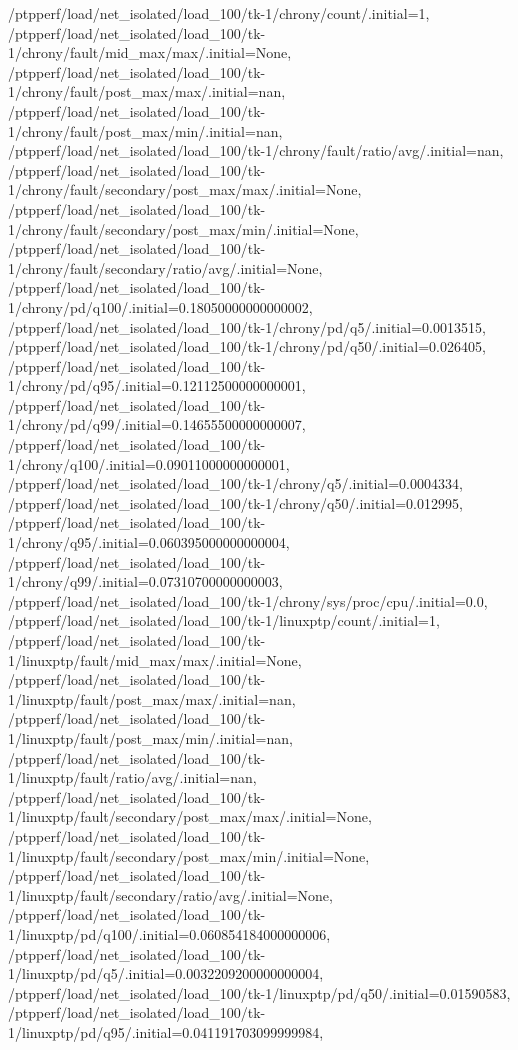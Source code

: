 {    /ptpperf/load/net_isolated/load_100/tk-1/chrony/count/.initial=1,
    /ptpperf/load/net_isolated/load_100/tk-1/chrony/fault/mid_max/max/.initial=None,
    /ptpperf/load/net_isolated/load_100/tk-1/chrony/fault/post_max/max/.initial=nan,
    /ptpperf/load/net_isolated/load_100/tk-1/chrony/fault/post_max/min/.initial=nan,
    /ptpperf/load/net_isolated/load_100/tk-1/chrony/fault/ratio/avg/.initial=nan,
    /ptpperf/load/net_isolated/load_100/tk-1/chrony/fault/secondary/post_max/max/.initial=None,
    /ptpperf/load/net_isolated/load_100/tk-1/chrony/fault/secondary/post_max/min/.initial=None,
    /ptpperf/load/net_isolated/load_100/tk-1/chrony/fault/secondary/ratio/avg/.initial=None,
    /ptpperf/load/net_isolated/load_100/tk-1/chrony/pd/q100/.initial=0.18050000000000002,
    /ptpperf/load/net_isolated/load_100/tk-1/chrony/pd/q5/.initial=0.0013515,
    /ptpperf/load/net_isolated/load_100/tk-1/chrony/pd/q50/.initial=0.026405,
    /ptpperf/load/net_isolated/load_100/tk-1/chrony/pd/q95/.initial=0.12112500000000001,
    /ptpperf/load/net_isolated/load_100/tk-1/chrony/pd/q99/.initial=0.14655500000000007,
    /ptpperf/load/net_isolated/load_100/tk-1/chrony/q100/.initial=0.09011000000000001,
    /ptpperf/load/net_isolated/load_100/tk-1/chrony/q5/.initial=0.0004334,
    /ptpperf/load/net_isolated/load_100/tk-1/chrony/q50/.initial=0.012995,
    /ptpperf/load/net_isolated/load_100/tk-1/chrony/q95/.initial=0.060395000000000004,
    /ptpperf/load/net_isolated/load_100/tk-1/chrony/q99/.initial=0.07310700000000003,
    /ptpperf/load/net_isolated/load_100/tk-1/chrony/sys/proc/cpu/.initial=0.0,
    /ptpperf/load/net_isolated/load_100/tk-1/linuxptp/count/.initial=1,
    /ptpperf/load/net_isolated/load_100/tk-1/linuxptp/fault/mid_max/max/.initial=None,
    /ptpperf/load/net_isolated/load_100/tk-1/linuxptp/fault/post_max/max/.initial=nan,
    /ptpperf/load/net_isolated/load_100/tk-1/linuxptp/fault/post_max/min/.initial=nan,
    /ptpperf/load/net_isolated/load_100/tk-1/linuxptp/fault/ratio/avg/.initial=nan,
    /ptpperf/load/net_isolated/load_100/tk-1/linuxptp/fault/secondary/post_max/max/.initial=None,
    /ptpperf/load/net_isolated/load_100/tk-1/linuxptp/fault/secondary/post_max/min/.initial=None,
    /ptpperf/load/net_isolated/load_100/tk-1/linuxptp/fault/secondary/ratio/avg/.initial=None,
    /ptpperf/load/net_isolated/load_100/tk-1/linuxptp/pd/q100/.initial=0.060854184000000006,
    /ptpperf/load/net_isolated/load_100/tk-1/linuxptp/pd/q5/.initial=0.0032209200000000004,
    /ptpperf/load/net_isolated/load_100/tk-1/linuxptp/pd/q50/.initial=0.01590583,
    /ptpperf/load/net_isolated/load_100/tk-1/linuxptp/pd/q95/.initial=0.041191703099999984,
}
